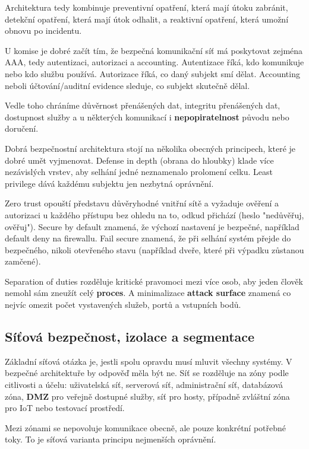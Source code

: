Architektura tedy kombinuje preventivní opatření, která mají útoku zabránit, detekční opatření, která mají útok odhalit, a reaktivní opatření, která umožní obnovu po incidentu.

U komise je dobré začít tím, že bezpečná komunikační síť má poskytovat zejména AAA, tedy autentizaci, autorizaci a accounting. Autentizace říká, kdo komunikuje nebo kdo službu používá. Autorizace říká, co daný subjekt smí dělat. Accounting neboli účtování/auditní evidence sleduje, co subjekt skutečně dělal.

Vedle toho chráníme důvěrnost přenášených dat, integritu přenášených dat, dostupnost služby a u některých komunikací i \textbf{nepopiratelnost} původu nebo doručení.

Dobrá bezpečnostní architektura stojí na několika obecných principech, které je dobré umět vyjmenovat. Defense in depth (obrana do hloubky) klade více nezávislých vrstev, aby selhání jedné neznamenalo prolomení celku. Least privilege dává každému subjektu jen nezbytná oprávnění.

Zero trust opouští představu důvěryhodné vnitřní sítě a vyžaduje ověření a autorizaci u každého přístupu bez ohledu na to, odkud přichází (heslo "nedůvěřuj, ověřuj"). Secure by default znamená, že výchozí nastavení je bezpečné, například default deny na firewallu. Fail secure znamená, že při selhání systém přejde do bezpečného, nikoli otevřeného stavu (například dveře, které při výpadku zůstanou zamčené).

Separation of duties rozděluje kritické pravomoci mezi více osob, aby jeden člověk nemohl sám zneužít celý \textbf{proces}. A minimalizace \textbf{attack surface} znamená co nejvíc omezit počet vystavených služeb, portů a vstupních bodů.

\subsection*{Síťová bezpečnost, izolace a segmentace}

Základní síťová otázka je, jestli spolu opravdu musí mluvit všechny systémy. V bezpečné architektuře by odpověď měla být ne. Síť se rozděluje na zóny podle citlivosti a účelu: uživatelská síť, serverová síť, administrační síť, databázová zóna, \textbf{DMZ} pro veřejně dostupné služby, síť pro hosty, případně zvláštní zóna pro IoT nebo testovací prostředí.

Mezi zónami se nepovoluje komunikace obecně, ale pouze konkrétní potřebné toky. To je síťová varianta principu nejmenších oprávnění.

